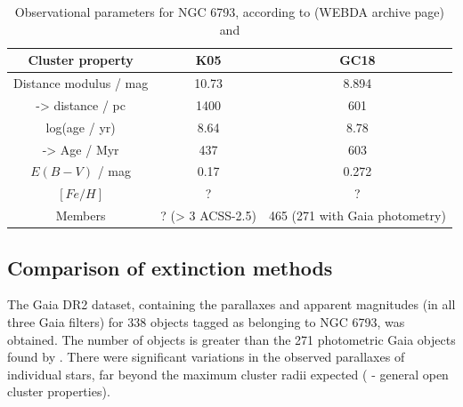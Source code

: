 \documentclass[12pt, a4paper]{report}
\begin{document}
\begin{table}
\begin{center}
\begin{tabular}{ccc}
\hline
Cluster property & K05 & GC18 \\
\hline
Distance modulus / mag & 10.73 & 8.894 \\
-> distance / pc & 1400 & 601 \\
log(age / yr) & 8.64 & 8.78 \\
-> Age / Myr & 437 & 603 \\
$E(B-V)$ / mag & 0.17 & 0.272 \\
$[Fe/H]$ & ? & ? \\
Members & ? (> 3 ACSS-2.5) & 465 (271 with Gaia photometry) \\
\hline
\end{tabular}
\caption{Observational parameters for NGC 6793, according to \cite{2005A&A...438.1163K} (WEBDA archive page) and \cite{2018A&A...616A..10G}}
\label{NGC6793_obs}
\end{center}
\end{table}

\subsection{Comparison of extinction methods}
The Gaia DR2 dataset, containing the parallaxes and apparent magnitudes (in all three Gaia filters) for 338 objects tagged as belonging to NGC 6793, was obtained. The number of objects is greater than the 271 photometric Gaia objects found by \cite{2018A&A...616A..10G}. There were significant variations in the observed parallaxes of individual stars, far beyond the maximum cluster radii expected (\cite{2006A&A...456..523S} - general open cluster properties).
\end{document}
